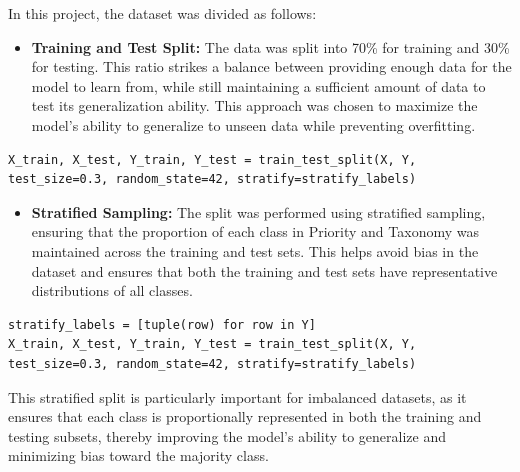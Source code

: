 In this project, the dataset was divided as follows:

\begin{itemize}
    \item \textbf{Training and Test Split:} The data was split into 70\% for training and 30\% for testing. This ratio strikes a balance between providing enough data for the model to learn from, while still maintaining a sufficient amount of data to test its generalization ability. This approach was chosen to maximize the model's ability to generalize to unseen data while preventing overfitting.
\end{itemize}

\vspace{0.2cm}
\noindent
\begin{minipage}{\linewidth}
\begin{verbatim}
X_train, X_test, Y_train, Y_test = train_test_split(X, Y, test_size=0.3, random_state=42, stratify=stratify_labels)
\end{verbatim}
\label{lst:dataset_split}
\end{minipage}
\vspace{0.1cm}

\begin{itemize}
    \item \textbf{Stratified Sampling:} The split was performed using stratified sampling, ensuring that the proportion of each class in Priority and Taxonomy was maintained across the training and test sets. This helps avoid bias in the dataset and ensures that both the training and test sets have representative distributions of all classes.
\end{itemize}

\vspace{0.2cm}
\noindent
\begin{minipage}{\linewidth}
\begin{verbatim}
stratify_labels = [tuple(row) for row in Y]
X_train, X_test, Y_train, Y_test = train_test_split(X, Y, test_size=0.3, random_state=42, stratify=stratify_labels)
\end{verbatim}
\label{lst:stratified_sampling}
\end{minipage}
\vspace{0.1cm}

This stratified split is particularly important for imbalanced datasets, as it ensures that each class is proportionally represented in both the training and testing subsets, thereby improving the model's ability to generalize and minimizing bias toward the majority class.

